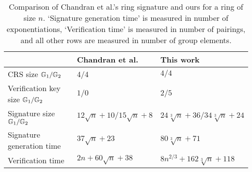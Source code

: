 
\begin{table}[h]
\begin{center}
\begin{minipage}{\textwidth}
\begin{center}
\begin{tabular}{l|l|l}
                                           & Chandran et al.~\cite{ICALP:ChaGroSah07} & This work \\
\hline%
\rule{0pt}{2.5ex}CRS size  $\mathbb{G}_1/\mathbb{G}_2$              & 4/4                                      & $4/4$       \\
\rule{0pt}{2.5ex}Verification key size $\mathbb{G}_1/\mathbb{G}_2$    & $1/0$                                       & $2/5$       \\
\rule{0pt}{2.5ex}Signature size      $\mathbb{G}_1/\mathbb{G}_2$      & $12\sqrt{n}+10/15\sqrt{n}+8$                        & $24\sqrt[3]{n} + 36/34\sqrt[3]{n} + 24$\\
\rule{0pt}{2.5ex}Signature generation time & $37\sqrt{n}+23$                        & $80\sqrt[3]{n}+71$\\
\rule{0pt}{2.5ex}Verification time         & $2n + 60\sqrt{n}+38$                & $8n^{2/3} + 162\sqrt[3]{n} + 118$\\
\end{tabular}
\end{center}
\caption{Comparison of Chandran et al.'s ring signature and ours for a ring of size $n$. `Signature generation time' is measured in number of exponentiations, `Verification time' is measured in number of pairings, and all other rows are measured in number of group elements.\label{table:eff}}
\end{minipage}
\end{center}
\end{table}
